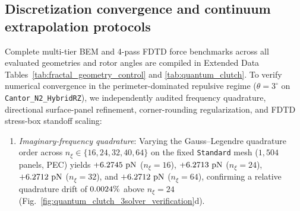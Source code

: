 \documentclass[pdflatex,sn-nature]{sn-jnl}
\DeclareRobustCommand{\roundfour}[1]{\fpeval{round(#1,4)}}
\begin{document}
\subsection*{Discretization convergence and continuum extrapolation protocols}
Complete multi-tier BEM and 4-pass FDTD force benchmarks across all evaluated geometries and rotor angles are compiled in Extended Data Tables~\ref{tab:fractal_geometry_control} and \ref{tab:quantum_clutch}. To verify numerical convergence in the perimeter-dominated repulsive regime ($\theta=3^\circ$ on \texttt{Cantor\_N2\_HybridRZ}), we independently audited frequency quadrature, directional surface-panel refinement, corner-rounding regularization, and FDTD stress-box standoff scaling:
\begin{enumerate}
    \item \emph{Imaginary-frequency quadrature}: Varying the Gauss--Legendre quadrature order across $n_\xi \in \{16, 24, 32, 40, 64\}$ on the fixed \texttt{Standard} mesh ($1{,}504$ panels, PEC) yields $+\roundfour{\BemConvStdNxionesixPecFzPn}\text{ pN}$ ($n_\xi=16$), $+\roundfour{\BemConvStdNxitwofourPecFzPn}\text{ pN}$ ($n_\xi=24$), $+\roundfour{\BemConvStdNxithreetwoPecFzPn}\text{ pN}$ ($n_\xi=32$), and $+\roundfour{\BemConvStdNxisixfourPecFzPn}\text{ pN}$ ($n_\xi=64$), confirming a relative quadrature drift of $\roundfour{\BemConvNxiDriftPct}\%$ above $n_\xi = 24$ (Fig.~\ref{fig:quantum_clutch_3solver_verification}d).

\end{enumerate}
\end{document}

